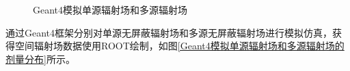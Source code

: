 \begin{figure}[htbp]
    \caption{Geant4模拟单源辐射场和多源辐射场}
    \label{Geant4模拟单源辐射场和多源辐射场}
\end{figure}

通过Geant4框架分别对单源无屏蔽辐射场和多源无屏蔽辐射场进行模拟仿真，获得空间辐射场数据使用ROOT绘制，如图\ref{Geant4模拟单源辐射场和多源辐射场的剂量分布}所示。

